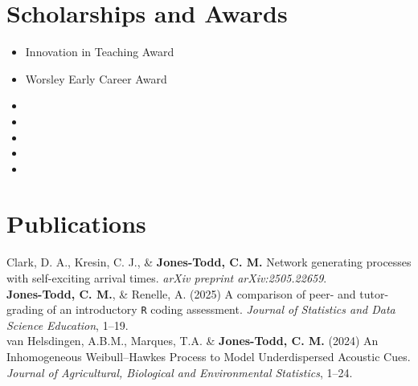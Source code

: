 \documentclass[10pt,a4paper]{moderncv}
\begin{document}
\section{Scholarships and Awards}
\vspace{2pt}
\begin{itemize}
  \item { {Innovation in Teaching Award}{}{}{}}
\item { {Worsley Early Career Award}{}{}{}}
  \item {}
  \item {}
 \item {}
 \item{}
   \item{}
  \vspace{2pt}

\end{itemize}
\newpage
  \section{Publications}


Clark, D. A., Kresin, C. J., \&  \textbf{Jones-Todd, C. M.} Network generating processes with self-exciting arrival times. \textit{arXiv preprint arXiv:2505.22659}.\\

\textbf{Jones-Todd, C. M.}, \& Renelle, A. (2025) A comparison of peer- and tutor-grading of an introductory \texttt{R} coding assessment. \textit{Journal of Statistics and Data Science Education}, 1--19.\\

  van Helsdingen, A.B.M., Marques, T.A. \& \textbf{Jones-Todd, C. M.} (2024) An Inhomogeneous Weibull–Hawkes Process to Model Underdispersed Acoustic Cues. \textit{Journal of Agricultural, Biological and Environmental Statistics}, 1--24.\\
\end{document}
